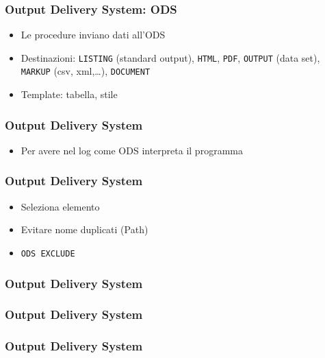 \documentclass[12pt]{beamer}
\begin{document}
\begin{frame}[containsverbatim]\frametitle{Output Delivery System: ODS}
  \begin{itemize}
  \item
    Le procedure inviano dati all'ODS
  \item
    Destinazioni: \verb+LISTING+ (standard output), \verb+HTML+, \verb+PDF+,
    \verb+OUTPUT+ (data set), \verb+MARKUP+ (csv, xml,\ldots), \verb+DOCUMENT+
  \item
    Template: tabella, stile
  \end{itemize}
\end{frame}


\begin{frame}[containsverbatim]\frametitle{Output Delivery System}
  \begin{itemize}
  \item
    Per avere nel log come ODS interpreta il programma
  \end{itemize}
\end{frame}


\begin{frame}[containsverbatim]\frametitle{Output Delivery System}
  \begin{itemize}
  \item
    Seleziona elemento
  \item
    Evitare nome duplicati (Path)
  \item
    \verb+ODS EXCLUDE+
  \end{itemize}
\end{frame}

\begin{frame}[containsverbatim]\frametitle{Output Delivery System}
\end{frame}


\begin{frame}[containsverbatim]\frametitle{Output Delivery System}
\end{frame}


\begin{frame}[containsverbatim]\frametitle{Output Delivery System}
\end{frame}
\end{document}
